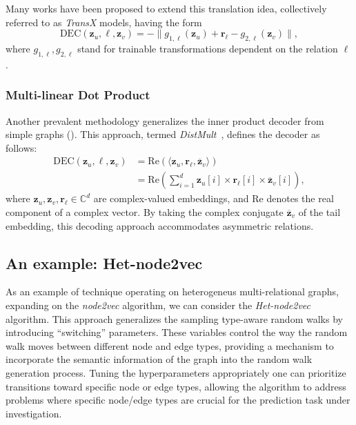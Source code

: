 Many works have been proposed to extend this translation idea, collectively referred to as \textit{TransX} models, having the form
\begin{equation*}
    \text{DEC}(\mathbf{z}_u, \ell, \mathbf{z}_v) = -\|g_{1,\ell}(\mathbf{z}_u) + \mathbf{r}_\ell - g_{2,\ell}(\mathbf{z}_v)\|,
\end{equation*}
where $ g_{1,\ell}, g_{2,\ell} $ stand for trainable transformations dependent on the relation $ \ell $.

\subsubsection{Multi-linear Dot Product}
Another prevalent methodology generalizes the inner product decoder from simple graphs (). This approach, termed \textit{DistMult}~\cite{Yang2014DistMult}, defines the decoder as follows:
\begin{align*}
\text{DEC}(\mathbf{z}_u, \ell, \mathbf{z}_v) &= \text{Re}(\langle \mathbf{z}_u, \mathbf{r}_\ell, \overline{\mathbf{z}}_v\rangle)\\
&= \text{Re}(\sum_{i=1}^d \mathbf{z}_u[i] \times \mathbf{r}_\ell[i] \times \overline{\mathbf{z}}_v[i]),
\end{align*}
where $ \mathbf{z}_u, \mathbf{z}_v, \mathbf{r}_\ell \in \mathbb{C}^d $ are complex-valued embeddings, and $ \text{Re} $ denotes the real component of a complex vector. By taking the complex conjugate $ \overline{\mathbf{z}}_v $ of the tail embedding, this decoding approach accommodates asymmetric relations.

\subsection{An example: Het-node2vec}
As an example of technique operating on heterogeneus multi-relational graphs, expanding on the \textit{node2vec} algorithm, we can consider the \textit{Het-node2vec}~\cite{soto2021hetnode2vec} algorithm. This approach generalizes the sampling type-aware random walks  by introducing ``switching'' parameters. These variables control the way the random walk moves between
different node and edge types, providing a mechanism to incorporate the semantic information of the graph into the random walk generation process. Tuning the hyperparameters appropriately one can prioritize transitions toward specific node or edge types, allowing the algorithm to address problems where specific node/edge types are crucial for the prediction task under investigation.




